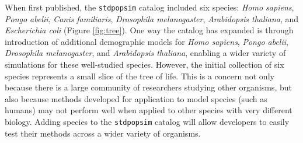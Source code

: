 \documentclass[hidelinks]{article}
\newcommand{\stdpopsim}{\texttt{stdpopsim}\xspace}
\begin{document}
When first published, the \stdpopsim catalog included six species:
\emph{Homo sapiens}, \emph{Pongo abelii}, \emph{Canis familiaris}, \emph{Drosophila melanogaster},
\emph{Arabidopsis thaliana}, and \emph{Escherichia coli} (Figure \ref{fig:tree}).
One way the catalog has expanded is through introduction of additional demographic models
for \emph{Homo sapiens}, \emph{Pongo abelii}, \emph{Drosophila melanogaster},
and \emph{Arabidopsis thaliana}, enabling a wider variety of simulations for these
well-studied species.
However, the initial collection of six species represents a small slice of the tree of life.
This is a concern
not only because there is a large community of researchers studying other organisms,
but also because methods developed for application to model species (such as humans)
may not perform well when applied to other species with very different biology.
Adding species to the \stdpopsim catalog will allow developers to easily test their methods across a wider variety of organisms.
\end{document}
